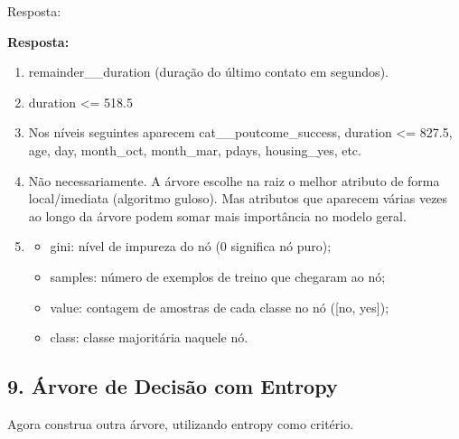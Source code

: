\documentclass[11pt]{article}
\providecommand{\tightlist}{%
      \setlength{\itemsep}{0pt}\setlength{\parskip}{0pt}}
\begin{document}
Resposta:

    \textbf{Resposta:}

\begin{enumerate}
\def\labelenumi{\arabic{enumi}.}
\tightlist
\item
  remainder\_\_duration (duração do último contato em segundos).
\item
  duration \textless= 518.5
\item
  Nos níveis seguintes aparecem cat\_\_poutcome\_success, duration
  \textless= 827.5, age, day, month\_oct, month\_mar, pdays,
  housing\_yes, etc.
\item
  Não necessariamente. A árvore escolhe na raiz o melhor atributo de
  forma local/imediata (algoritmo guloso). Mas atributos que aparecem
  várias vezes ao longo da árvore podem somar mais importância no modelo
  geral.
\item
  \begin{itemize}
  \tightlist
  \item
    gini: nível de impureza do nó (0 significa nó puro);
  \item
    samples: número de exemplos de treino que chegaram ao nó;
  \item
    value: contagem de amostras de cada classe no nó ({[}no, yes{]});
  \item
    class: classe majoritária naquele nó.
  \end{itemize}
\end{enumerate}

    \subsection{9. Árvore de Decisão com
Entropy}\label{uxe1rvore-de-decisuxe3o-com-entropy}

Agora construa outra árvore, utilizando entropy como critério.
\end{document}
